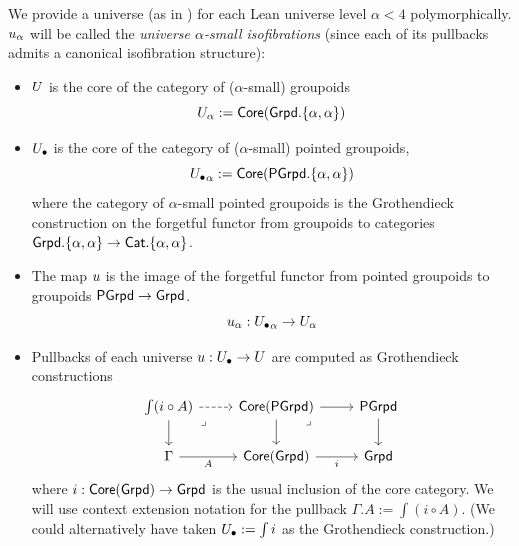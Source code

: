 \begin{definition}
\label{sec:universe-in-groupoid-model}
We provide a universe (as in )
for each Lean universe level $\alpha < 4$ polymorphically.
${u}_\alpha$ will be called the \emph{universe $\alpha$-small isofibrations}
(since each of its pullbacks admits a canonical isofibration structure):
\begin{itemize}
  \item $U$ is the core of the category of ($\alpha$-small) groupoids
  \[U_\alpha := \mathop{\mathsf{Core}} (\mathsf{Grpd}.\{\alpha,\alpha\})\]
  \item ${U_\bullet}$ is the core of the category of ($\alpha$-small) pointed groupoids,
  \[{U_\bullet}_\alpha := \mathop{\mathsf{Core}} (\mathsf{PGrpd}.\{\alpha,\alpha\})\]
  where the category of $\alpha$-small pointed groupoids is the
  Grothendieck construction on the forgetful functor from groupoids to categories
  $\mathsf{Grpd}.\{\alpha,\alpha\} \to \mathsf{Cat}.\{\alpha,\alpha\}$.
  \item The map ${u}$ is the image of the forgetful functor
  from pointed groupoids to groupoids $\mathsf{PGrpd} \to \mathsf{Grpd}$.
  \[ {u}_\alpha : {U_\bullet}_\alpha \to U_\alpha\]
  \item Pullbacks of each universe ${u} : {U_\bullet} \to U$
    are computed as Grothendieck constructions
  \[ \begin{tikzcd}
	{\int (i \circ A)} & {\Core(\PGrpd)} & \PGrpd \\
	\Gamma & {\Core(\Grpd)} & \Grpd
	\arrow[dashed, from=1-1, to=1-2]
	\arrow[from=1-1, to=2-1]
	\arrow["\lrcorner"{anchor=center, pos=0.125}, draw=none, from=1-1, to=2-2]
	\arrow[from=1-2, to=1-3]
	\arrow[from=1-2, to=2-2]
	\arrow["\lrcorner"{anchor=center, pos=0.125}, draw=none, from=1-2, to=2-3]
	\arrow[from=1-3, to=2-3]
	\arrow["A"', from=2-1, to=2-2]
	\arrow["i"', from=2-2, to=2-3]
  \end{tikzcd} \]
  where $i : \mathop{\mathsf{Core}} (\mathsf{Grpd}) \to \mathsf{Grpd}$ is the usual inclusion of the core category.
  We will use context extension notation for
  the pullback $\Gamma . A := {\int (i \circ A)}$.
  (We could alternatively have taken ${U_\bullet} := \int i$ as the Grothendieck construction.)
\end{itemize}
\end{definition}

